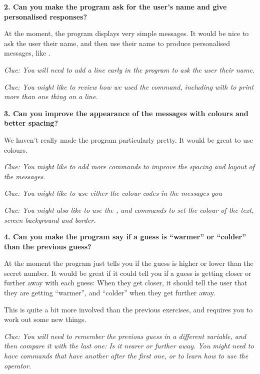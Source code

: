 {\bf 2. Can you make the program ask for the user's name and give
  personalised responses?}

At the moment, the program displays very simple messages. It would
be nice to ask the user their name, and then use their name to produce
personalised messages, like .

{\em Clue: You will need to add a line early in the program to ask
  the user their name.}

{\em Clue: You might like to review how we used the 
  command, including with \stw{;} to print more than one thing on a line.}

{\bf 3. Can you improve the appearance of the messages with colours and better spacing?}

We haven't really made the program particularly pretty.  It would be
great to use colours.

{\em Clue: You might like to add more  commands to improve
  the spacing and layout of the messages.}

{\em Clue: You might like to use either the colour codes
  in the messages you }

{\em Clue: You might also like to use the ,
 and  commands to set the colour of the
text, screen background and border.
}


{\bf 4. Can you make the program say if a guess is ``warmer'' or ``colder'' than the previous guess?}

At the moment the program just tells you if the guess is higher or
lower than the secret number.  It would be great if it could tell you
if a guess is getting closer or further away with each guess: When
they get closer, it should tell the user that they are getting ``warmer'',
and ``colder'' when they get further away.

This is quite a bit more involved than the previous exercises, and
requires you to work out some new things.

{\em Clue: You will need to remember the previous guess in a different
  variable, and then compare it with the last one: Is it nearer or
  further away. You might need to have  commands that have
  another  after the first one, or to learn how to use the
   operator.}

